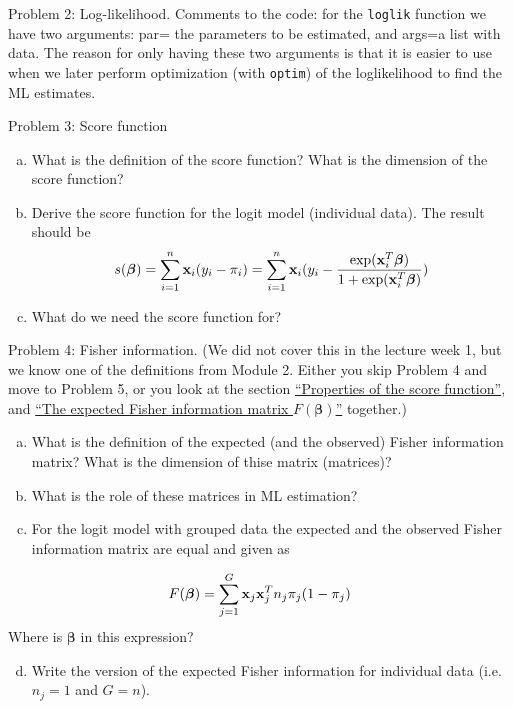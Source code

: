 \documentclass[
  ignorenonframetext,
]{beamer}
\providecommand{\tightlist}{%
  \setlength{\itemsep}{0pt}\setlength{\parskip}{0pt}}
\begin{document}
\begin{frame}[fragile]
\begin{block}{Problem 2: Log-likelihood.}
Comments to the code: for the \texttt{loglik} function we have two
arguments: par= the parameters to be estimated, and args=a list with
data. The reason for only having these two arguments is that it is
easier to use when we later perform optimization (with \texttt{optim})
of the loglikelihood to find the ML estimates.
\end{block}
\end{frame}

\begin{frame}
\begin{block}{Problem 3: Score function}
\protect\hypertarget{problem-3-score-function}{}
\begin{enumerate}
[a)]
\tightlist
\item
  What is the definition of the score function? What is the dimension of
  the score function?
\item
  Derive the score function for the logit model (individual data). The
  result should be
  \[s(\boldsymbol{\beta})=\sum_{i=1}^n {\bf x}_i (y_i-\pi_i)=\sum_{i=1}^n {\bf x}_i (y_i-\frac{\exp({\bf x}_i^T\boldsymbol{\beta})}{1+\exp({\bf x}_i^T\boldsymbol{\beta})})\]
\item
  What do we need the score function for?
\end{enumerate}
\end{block}
\end{frame}

\begin{frame}
\begin{block}{Problem 4: Fisher information.}
\protect\hypertarget{problem-4-fisher-information.}{}
(We did not cover this in the lecture week 1, but we know one of the
definitions from Module 2. Either you skip Problem 4 and move to Problem
5, or you look at the section \protect\hyperlink{propscore}{``Properties
of the score function''}, and \protect\hyperlink{covscore}{``The
expected Fisher information matrix \(F(\boldsymbol{\beta})\)''}
together.)

\begin{enumerate}
[a)]
\item
  What is the definition of the expected (and the observed) Fisher
  information matrix? What is the dimension of thise matrix (matrices)?
\item
  What is the role of these matrices in ML estimation?
\item
  For the logit model with grouped data the expected and the observed
  Fisher information matrix are equal and given as
\end{enumerate}

\[F(\boldsymbol{\beta})=\sum_{j=1}^G {\bf x}_j {\bf x}_j^T n_j \pi_j (1-\pi_j)\]
Where is \(\boldsymbol{\beta}\) in this expression?

\begin{enumerate}
[a)]
\setcounter{enumi}{3}
\tightlist
\item
  Write the version of the expected Fisher information for individual
  data (i.e.~\(n_j=1\) and \(G=n\)).
\end{enumerate}
\end{block}
\end{frame}
\end{document}
